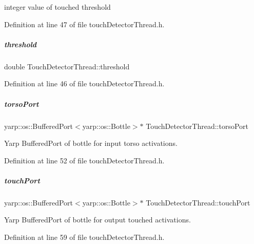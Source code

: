 integer value of touched threshold 



Definition at line 47 of file touch\+Detector\+Thread.\+h.

\mbox{\label{group__touchDetector_a876e80882e9772d72a1062f1bd67aca6}} 
\subparagraph{\texorpdfstring{threshold}{threshold}}
{\footnotesize\ttfamily double Touch\+Detector\+Thread\+::threshold\hspace{0.3cm}{\ttfamily [protected]}}



Definition at line 46 of file touch\+Detector\+Thread.\+h.

\mbox{\label{group__touchDetector_a40c56d22bab1fdb6876c5ff7ea06e9e8}} 
\subparagraph{\texorpdfstring{torso\+Port}{torsoPort}}
{\footnotesize\ttfamily yarp\+::os\+::\+Buffered\+Port$<$yarp\+::os\+::\+Bottle$>$$\ast$ Touch\+Detector\+Thread\+::torso\+Port\hspace{0.3cm}{\ttfamily [protected]}}



Yarp Buffered\+Port of bottle for input torso activations. 



Definition at line 52 of file touch\+Detector\+Thread.\+h.

\mbox{\label{group__touchDetector_aba1732a9b24e61da4ad3ed1650a214ea}} 
\subparagraph{\texorpdfstring{touch\+Port}{touchPort}}
{\footnotesize\ttfamily yarp\+::os\+::\+Buffered\+Port$<$yarp\+::os\+::\+Bottle$>$$\ast$ Touch\+Detector\+Thread\+::touch\+Port\hspace{0.3cm}{\ttfamily [protected]}}



Yarp Buffered\+Port of bottle for output touched activations. 



Definition at line 59 of file touch\+Detector\+Thread.\+h.

